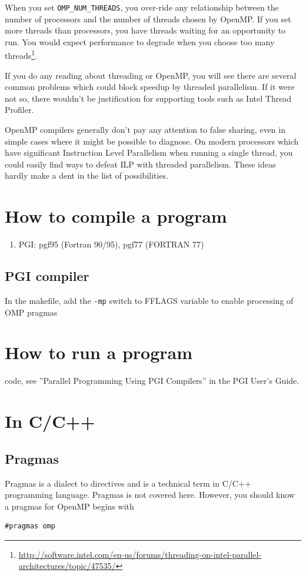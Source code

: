 When you set \verb!OMP_NUM_THREADS!, you over-ride any relationship
between the number of processors and the number of threads chosen by
OpenMP. If you set more threads than processors, you have threads
waiting for an opportunity to run. You would expect performance to
degrade when you choose too many
threads\footnote{\url{http://software.intel.com/en-us/forums/threading-on-intel-parallel-architectures/topic/47535/}}.

If you do any reading about threading or OpenMP, you will see there
are several common problems which could block speedup by threaded
parallelism. If it were not so, there wouldn't be justification for
supporting tools such as Intel Thread Profiler.

OpenMP compilers generally don't pay any attention to false sharing,
even in simple cases where it might be possible to diagnose. On modern
processors which have significant Instruction Level Parallelism when
running a single thread, you could easily find ways to defeat ILP with
threaded parallelism. These ideas hardly make a dent in the list of
possibilities.


\section{How to compile a program}
\label{sec:how-compile-program}

\begin{enumerate}
\item PGI: pgf95 (Fortran 90/95), pgf77 (FORTRAN 77)
\end{enumerate}
\subsection{PGI compiler}
\label{sec:pgi-compiler}

In the makefile, add the \verb!-mp! switch to FFLAGS variable to
enable processing of OMP pragmas 


\section{How to run a program}
\label{sec:how-run-program}

code, see ''Parallel Programming Using PGI Compilers'' in the PGI User's
Guide.

\section{In C/C++}
\label{sec:cc++}

\subsection{Pragmas}
\label{sec:pragmas}

Pragmas is a dialect to directives and is a technical term in C/C++
programming language. Pragmas is not covered here. However, you should
know a pragmas for OpenMP begins with
\begin{verbatim}
#pragmas omp
\end{verbatim}



